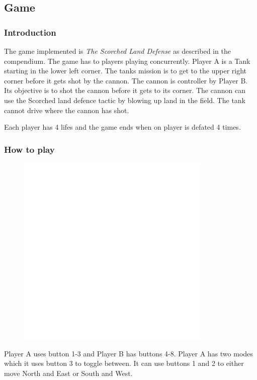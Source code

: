 \subsection{Game}

\subsubsection{Introduction}
The game implemented is {\it The Scorched Land Defense} as described in the compendium. The game has
to players playing concurrently. Player A is a Tank starting in the lower left corner. The tanks
mission is to get to the upper right corner before it gets shot by the cannon. The cannon is
controller by Player B. Its objective is to shot the cannon before it gets to its corner. The cannon
can use the Scorched land defence tactic by blowing up land in the field. The tank cannot drive
where the cannon has shot.

Each player has 4 lifes and the game ends when on player is defated 4 times.

\subsubsection{How to play}

\begin{figure}[h]
  \includegraphics[width=350px]{graphics/game_screen_with_buttons.png}

\end{figure}

Player A uses button 1-3 and Player B has buttons 4-8. Player A has two modes which it uses button 3
to toggle between. It can use buttons 1 and 2 to either move North and East or South and West.

